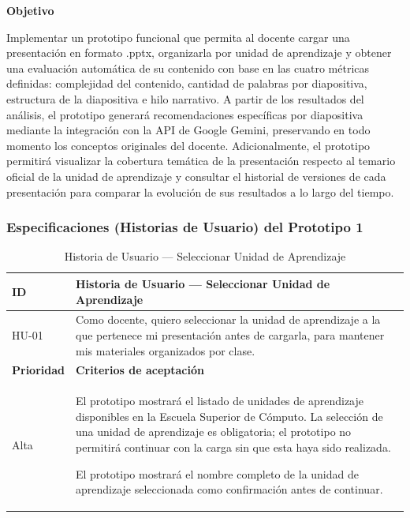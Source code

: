 \documentclass[11pt]{article}
\newcommand{\ttstyle}{%
  \small
  \setlength{\tabcolsep}{6pt}%
  \renewcommand{\arraystretch}{1.25}%
  \arrayrulecolor{azulprofundo}%
}
\newcommand{\hairrule}{%
  \arrayrulecolor{azulregla}\midrule[0.3pt]\arrayrulecolor{azulprofundo}%
}
\begin{document}
\textbf{Objetivo}

Implementar un prototipo funcional que permita al docente cargar una presentación en formato .pptx, organizarla por unidad de aprendizaje y obtener una evaluación automática de su contenido con base en las cuatro métricas definidas: complejidad del contenido, cantidad de palabras por diapositiva, estructura de la diapositiva e hilo narrativo. A partir de los resultados del análisis, el prototipo generará recomendaciones específicas por diapositiva mediante la integración con la API de Google Gemini, preservando en todo momento los conceptos originales del docente. Adicionalmente, el prototipo permitirá visualizar la cobertura temática de la presentación respecto al temario oficial de la unidad de aprendizaje y consultar el historial de versiones de cada presentación para comparar la evolución de sus resultados a lo largo del tiempo.

\subsubsection*{Especificaciones (Historias de Usuario) del Prototipo 1}

\begin{table}[H]
    \centering
    \renewcommand{\arraystretch}{1.2}
    \ttstyle
    \begin{tabular}{p{2.5cm}p{11cm}}
        \toprule
        \textbf{ID} & \textbf{Historia de Usuario --- Seleccionar Unidad de Aprendizaje} \\
        \midrule
        HU-01 & Como docente, quiero seleccionar la unidad de aprendizaje a la que pertenece mi presentación antes de cargarla, para mantener mis materiales organizados por clase. \\
        \hairrule
        \textbf{Prioridad} & \textbf{Criterios de aceptación} \\
        \hairrule
        Alta & El prototipo mostrará el listado de unidades de aprendizaje disponibles en la Escuela Superior de Cómputo. La selección de una unidad de aprendizaje es obligatoria; el prototipo no permitirá continuar con la carga sin que esta haya sido realizada. 
        
        El prototipo mostrará el nombre completo de la unidad de aprendizaje seleccionada como confirmación antes de continuar. \\
        \bottomrule
    \end{tabular}
    \caption{Historia de Usuario — Seleccionar Unidad de Aprendizaje}
    \label{tab:hu-seleccionar-unidad}
\end{table}
\end{document}
